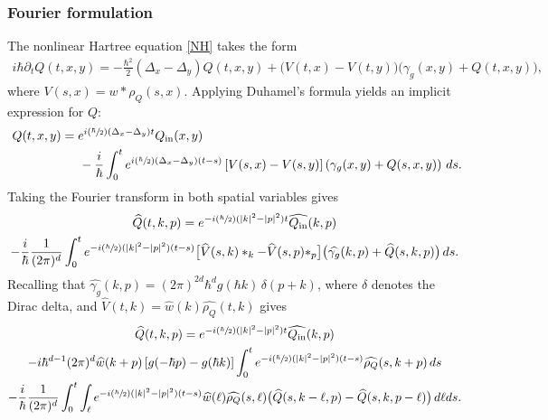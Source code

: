 \documentclass[JEP,XML,SOM,Unicode]{cedram}
\newcommand{\Psfrac}[2]{(\sfrac{#1}{#2})}
\theoremstyle{plain}
\theoremstyle{remark}
\newcommand{\br}[1]{\left(#1\right)}
\newcommand{\bbr}[1]{\bigl(#1 \bigr)}
\newcommand{\tpd}{\frac{1}{(2\pi)^{d}}}
\newcommand{\ak}{\abs{k}}
\newcommand{\ap}{\abs{p}}
\newcommand{\sbbr}[1]{\bigl[#1\bigr]}
\newcommand{\sbr}[1]{\left[#1\right]}
\newcommand{\p}{\partial}
\begin{document}
\subsubsection{Fourier formulation}
The nonlinear Hartree equation \eqref{NH} takes the form
\begin{align*}
i\hbar\p_tQ(t,x,y)=-{\frac{\hbar^2}{2}}\br{\Delta_x-\Delta_y}Q(t,x,y)+\bbr{V(t,x)-V(t,y)}\bbr{\gamma_g(x,y)+Q(t,x,y)},
\end{align*}where $V(s,x)=w*\rho_Q(s,x)$.
Applying Duhamel's formula yields an implicit expression for $Q$:
\begin{align*}\begin{split}\
Q(t,x,y)&=e^{i{\Psfrac{\hbar}{2}} (\Delta_x-\Delta_y)t}Q_{\mathrm{in}}(x,y)\\
&\hspace{0.5cm}-
\frac{i}{\hbar}\int_0^te^{i{\Psfrac{\hbar}{2}}(\Delta_x-\Delta_y)(t-s)}\sbr{V(s,x)-V(s,y)}\br{\gamma_g(x,y)+Q(s,x,y)}\,ds.\end{split}
\end{align*}
Taking the Fourier transform in both spatial variables gives
\begin{multline*}
\widehat Q(t,k,p)=e^{-i{\Psfrac{\hbar}{2}}(\ak^2-\ap^2)t}\widehat{Q_{\mathrm{in}}}(k,p)\\
-\frac{i}{\hbar}\tpd\int_0^te^{-i{\Psfrac{\hbar}{2}}(\ak^2-\ap^2)(t-s)}\sbbr{\widehat V(s,k)*_k-\widehat V(s,p)*_p}\bbr{\widehat{\gamma_g}(k,p)+\widehat{Q}(s,k,p)}\,ds.
\end{multline*}
Recalling that $\widehat{\gamma_g}(k,p)=(2\pi)^{2d}\hbar^d g(\hbar k)\,\delta(p+k)$, where $\delta$ denotes the Dirac delta, and $\widehat V(t,k)=\widehat w(k)\widehat{\rho_Q}(t,k)$ gives
\begin{multline*}
\widehat Q(t,k,p)=e^{-i{\Psfrac{\hbar}{2}}(\ak^2-\ap^2)t}\widehat{Q_{\mathrm{in}}}(k,p)\\
-i\hbar^{d-1}(2\pi)^d\widehat w(k+p)\sbr{g(-\hbar p)-g(\hbar k)}\int_0^te^{-i{\Psfrac{\hbar}{2}}(\ak^2-\ap^2)(t-s)}\widehat{\rho_Q}(s,k+p)\,ds\\
-\frac{i}{\hbar}\tpd\int_0^t\int_\ell e^{-i{\Psfrac{\hbar}{2}}(\ak^2-\ap^2)(t-s)}\widehat w(\ell )\widehat{\rho_Q}(s,\ell )\bbr{\widehat{Q}(s,k-\ell ,p)-\widehat{Q}(s,k,p-\ell )}\,d\ell ds.
\end{multline*}
\end{document}
